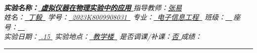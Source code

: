 \documentclass[UTF8]{article}
\theoremstyle{MyLineTheoremStyle} %
\theoremstyle{MyBlockTheoremStyle} %
\theoremstyle{MySubsubsectionStyle} %
\begin{document}


\begin{center}\large
    \\\vspace{0.4cm}
    \noindent\textit{
        \textbf{\bfseries 实验名称：}\uline{\hspace{1.5cm} \bfseries 虚拟仪器在物理实验中的应用 \hspace{1.5cm}}\hspace{0.4cm} 
        指导教师：\uline{\hspace{1.5cm}张易\hspace{1.5cm}}}
    \\\vspace{0.1cm}
    \noindent\textit{
        姓名：\uline{\,\,\,丁毅\,\,\,}\hspace{0.2cm}
        学号：\uline{\,\,\,{\upshape 2023K8009908031}\,\,\,}\hspace{0.2cm}
        专业：\uline{\,\,\,电子信息工程\,\,\,}\hspace{0.2cm}
        班级：\uline{\,\,\,\,\,\,}\,座号：\uline{\,\,\,\,\,\,}}
    \\\vspace{0.1cm}
    \noindent\textit{
        实验日期：\uline{\,\,{.15}\,\,}\hspace{0.2cm}
        实验地点：\uline{\,\,\,教学楼{}\,\,\,}\hspace{0.2cm}
        是否调课/补课：\uline{\hspace{0.26cm}否 \hspace{0.26cm}}\hspace{0.2cm}
        成绩：\uline{\hspace{2cm}}}
\end{center}
\noindent\rule{\textwidth}{0.1em}   %


\setcounter{tocdepth}{2}  %
\noindent\tableofcontents\thispagestyle{fancy}   %
\end{document}
